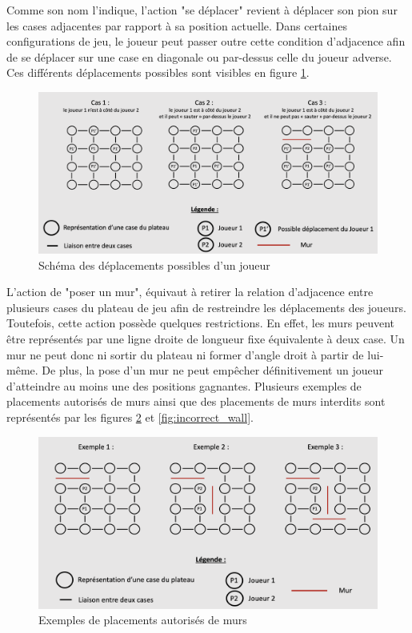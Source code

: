\documentclass[11pt]{article}
\begin{document}
\vspace{4mm}

Comme son nom l'indique, l'action "se déplacer" revient à déplacer son pion sur les cases adjacentes par rapport à sa position actuelle. Dans certaines configurations de jeu, le joueur peut passer outre cette condition d'adjacence afin de se déplacer sur une case en diagonale ou par-dessus celle du joueur adverse. Ces différents déplacements possibles sont visibles en figure \ref{fig:correct_move}.

\begin{figure}[H]
    \centering
    \includegraphics[width=\linewidth]{correct_move.png}
    \caption{Schéma des déplacements possibles d'un joueur}
    \label{fig:correct_move}
\end{figure}

L'action de "poser un mur", équivaut à retirer la relation d'adjacence entre plusieurs cases du plateau de jeu afin de restreindre les déplacements des joueurs. Toutefois, cette action possède quelques restrictions. En effet, les murs peuvent être représentés par une ligne droite de longueur fixe équivalente à deux case. Un mur ne peut donc ni sortir du plateau ni former d'angle droit à partir de lui-même. De plus, la pose d'un mur ne peut empêcher définitivement un joueur d'atteindre au moins une des positions gagnantes. Plusieurs exemples de placements autorisés de murs ainsi que des placements de murs interdits sont représentés par les figures \ref{fig:correct_wall} et \ref{fig:incorrect_wall}.

\begin{figure}[H]
    \centering
    \includegraphics[width=\linewidth]{correct_wall.png}
    \caption{Exemples de placements autorisés de murs}
    \label{fig:correct_wall}
\end{figure}
\end{document}
